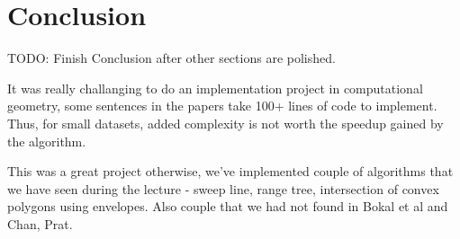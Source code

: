 \documentclass{article}
\begin{document}
\section{Conclusion}
\label{sec:conclusion}

TODO: Finish Conclusion after other sections are polished.

It was really challanging to do an implementation project in computational geometry, some sentences in the papers take 100+ lines of code to implement. Thus, for small datasets, added complexity is not worth the speedup gained by the algorithm.

This was a great project otherwise, we've implemented couple of algorithms that we have seen during the lecture - sweep line, range tree, intersection of convex polygons using envelopes. Also couple that we had not found in Bokal et al and Chan, Prat.



\end{document}
